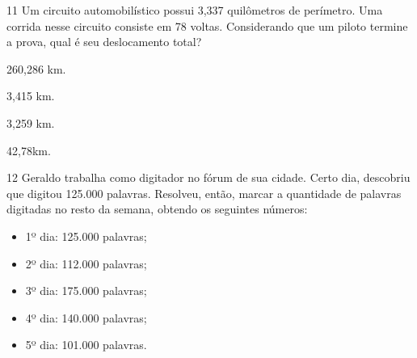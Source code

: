 



\num{11} Um circuito automobilístico possui 3,337 quilômetros de perímetro. Uma
corrida nesse circuito consiste em 78 voltas. Considerando que um piloto
termine a prova, qual é seu deslocamento total?

\begin{escolha}
\item 260,286 km.
\item 3,415 km.
\item 3,259 km.
\item 42,78km.
\end{escolha}







\pagebreak

\num{12} Geraldo trabalha como digitador no fórum de sua cidade. Certo
dia, descobriu que digitou 125.000 palavras. Resolveu, então, marcar a
quantidade de palavras digitadas no resto da semana, obtendo os
seguintes números:

\begin{itemize}
\item 1º dia: 125.000 palavras;

\item 2º dia: 112.000 palavras;

\item 3º dia: 175.000 palavras;

\item 4º dia: 140.000 palavras;

\item 5º dia: 101.000 palavras.
\end{itemize}

